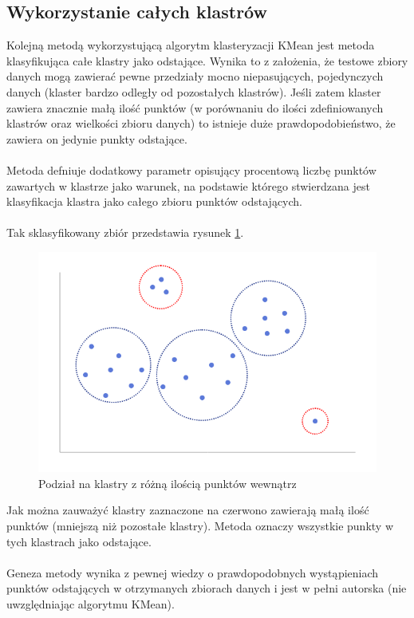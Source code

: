 \documentclass[eng,printmode]{mgr}
\begin{document}
\subsection{Wykorzystanie całych klastrów}
\label{sec:kmean_sim}
Kolejną metodą wykorzystującą algorytm klasteryzacji KMean jest metoda klasyfikująca całe klastry jako odstające. Wynika to z założenia, że testowe zbiory danych mogą zawierać pewne przedziały mocno niepasujących, pojedynczych danych (klaster bardzo odległy od pozostałych klastrów). Jeśli zatem klaster zawiera znacznie małą ilość punktów (w porównaniu do ilości zdefiniowanych klastrów oraz wielkości zbioru danych) to istnieje duże prawdopodobieństwo, że zawiera on jedynie punkty odstające. \\\\
Metoda defniuje dodatkowy parametr opisujący procentową liczbę punktów zawartych w klastrze jako warunek, na podstawie którego stwierdzana jest klasyfikacja klastra jako całego zbioru punktów odstających.
\\\\
Tak sklasyfikowany zbiór przedstawia rysunek \ref{fig:KMean_sim}.
\begin{figure}[H]
  \begin{center}
  \includegraphics[scale=0.7]{KMean_sim}
  \end{center}
  \caption{Podział na klastry z różną ilością punktów wewnątrz}
  \label{fig:KMean_sim}
\end{figure}
Jak można zauważyć klastry zaznaczone na czerwono zawierają małą ilość punktów (mniejszą niż pozostałe klastry). Metoda oznaczy wszystkie punkty w tych klastrach jako odstające.
\\\\
Geneza metody wynika z pewnej wiedzy o prawdopodobnych wystąpieniach punktów odstających w otrzymanych zbiorach danych i jest w pełni autorska (nie uwzględniając algorytmu KMean).
\end{document}
